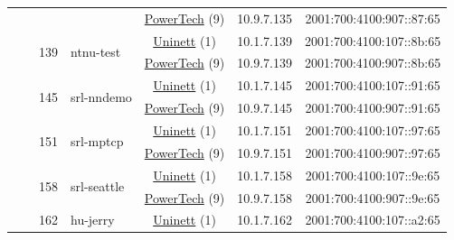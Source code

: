 \begin{small}
\begin{center}
\begin{longtable}{|c|c|c|c|c|c|c|c|}
  &  &  &  & \multicolumn{2}{|c|}{\tiny{\href{http://www.powertech.no}{PowerTech} (9)}} & \tiny{10.9.7.135} & \tiny{2001:700:4100:907::87:65} \\* \cline{3-3}\cline{4-4}\cline{5-5}\cline{6-6}\cline{7-7}\cline{8-8}
  &  & \multirow{2}{*}{\tiny{139}} & \multicolumn{1}{|l|}{\multirow{2}{*}{\tiny{ntnu-test}}} & \multicolumn{2}{|c|}{\tiny{\href{https://www.uninett.no}{Uninett} (1)}} & \tiny{10.1.7.139} & \tiny{2001:700:4100:107::8b:65} \\* \cline{5-5}\cline{6-6}\cline{7-7}\cline{8-8}
  &  &  &  & \multicolumn{2}{|c|}{\tiny{\href{http://www.powertech.no}{PowerTech} (9)}} & \tiny{10.9.7.139} & \tiny{2001:700:4100:907::8b:65} \\* \cline{3-3}\cline{4-4}\cline{5-5}\cline{6-6}\cline{7-7}\cline{8-8}
  &  & \multirow{2}{*}{\tiny{145}} & \multicolumn{1}{|l|}{\multirow{2}{*}{\tiny{srl-nndemo}}} & \multicolumn{2}{|c|}{\tiny{\href{https://www.uninett.no}{Uninett} (1)}} & \tiny{10.1.7.145} & \tiny{2001:700:4100:107::91:65} \\* \cline{5-5}\cline{6-6}\cline{7-7}\cline{8-8}
  &  &  &  & \multicolumn{2}{|c|}{\tiny{\href{http://www.powertech.no}{PowerTech} (9)}} & \tiny{10.9.7.145} & \tiny{2001:700:4100:907::91:65} \\* \cline{3-3}\cline{4-4}\cline{5-5}\cline{6-6}\cline{7-7}\cline{8-8}
  &  & \multirow{2}{*}{\tiny{151}} & \multicolumn{1}{|l|}{\multirow{2}{*}{\tiny{srl-mptcp}}} & \multicolumn{2}{|c|}{\tiny{\href{https://www.uninett.no}{Uninett} (1)}} & \tiny{10.1.7.151} & \tiny{2001:700:4100:107::97:65} \\* \cline{5-5}\cline{6-6}\cline{7-7}\cline{8-8}
  &  &  &  & \multicolumn{2}{|c|}{\tiny{\href{http://www.powertech.no}{PowerTech} (9)}} & \tiny{10.9.7.151} & \tiny{2001:700:4100:907::97:65} \\* \cline{3-3}\cline{4-4}\cline{5-5}\cline{6-6}\cline{7-7}\cline{8-8}
  &  & \multirow{2}{*}{\tiny{158}} & \multicolumn{1}{|l|}{\multirow{2}{*}{\tiny{srl-seattle}}} & \multicolumn{2}{|c|}{\tiny{\href{https://www.uninett.no}{Uninett} (1)}} & \tiny{10.1.7.158} & \tiny{2001:700:4100:107::9e:65} \\* \cline{5-5}\cline{6-6}\cline{7-7}\cline{8-8}
  &  &  &  & \multicolumn{2}{|c|}{\tiny{\href{http://www.powertech.no}{PowerTech} (9)}} & \tiny{10.9.7.158} & \tiny{2001:700:4100:907::9e:65} \\* \cline{3-3}\cline{4-4}\cline{5-5}\cline{6-6}\cline{7-7}\cline{8-8}
  &  & \multirow{2}{*}{\tiny{162}} & \multicolumn{1}{|l|}{\multirow{2}{*}{\tiny{hu-jerry}}} & \multicolumn{2}{|c|}{\tiny{\href{https://www.uninett.no}{Uninett} (1)}} & \tiny{10.1.7.162} & \tiny{2001:700:4100:107::a2:65} \\* \cline{5-5}\cline{6-6}\cline{7-7}\cline{8-8}

\end{longtable}
\end{center}
\end{small}
